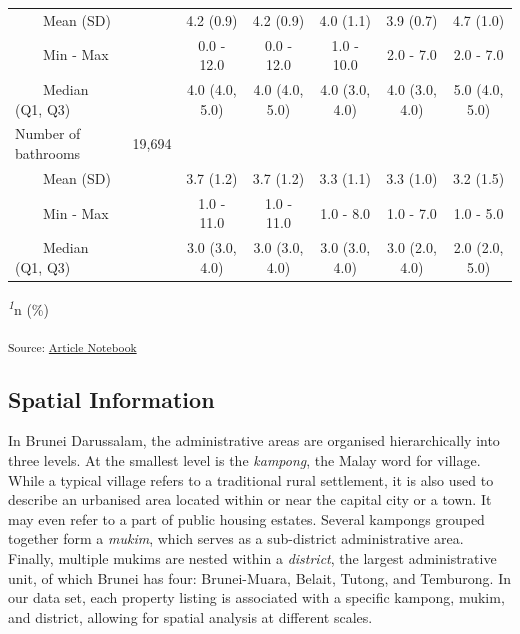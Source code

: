 \documentclass[
  number]{elsarticle}
\begin{document}
\begin{landscape}
\begin{table}
{\begin{tabular*}{\linewidth}{@{\extracolsep{\fill}}lcccccc}
    Mean (SD) &  & 4.2 (0.9) & 4.2 (0.9) & 4.0 (1.1) & 3.9 (0.7) & 4.7 (1.0) \\ 
    Min - Max &  & 0.0 - 12.0 & 0.0 - 12.0 & 1.0 - 10.0 & 2.0 - 7.0 & 2.0 - 7.0 \\ 
    Median (Q1, Q3) &  & 4.0 (4.0, 5.0) & 4.0 (4.0, 5.0) & 4.0 (3.0, 4.0) & 4.0 (3.0, 4.0) & 5.0 (4.0, 5.0) \\ 
Number of bathrooms & 19,694 &  &  &  &  &  \\ 
    Mean (SD) &  & 3.7 (1.2) & 3.7 (1.2) & 3.3 (1.1) & 3.3 (1.0) & 3.2 (1.5) \\ 
    Min - Max &  & 1.0 - 11.0 & 1.0 - 11.0 & 1.0 - 8.0 & 1.0 - 7.0 & 1.0 - 5.0 \\ 
    Median (Q1, Q3) &  & 3.0 (3.0, 4.0) & 3.0 (3.0, 4.0) & 3.0 (3.0, 4.0) & 3.0 (2.0, 4.0) & 2.0 (2.0, 5.0) \\ 
\bottomrule
\end{tabular*}
\begin{minipage}{\linewidth}
\textsuperscript{\textit{1}}n (\%)\\
\end{minipage}

\textsubscript{Source:
\href{https://Bruneiverse.github.io/house-data/manuscript.qmd.html}{Article
Notebook}}

}

\end{table}%

\end{landscape}

\subsection{Spatial Information}\label{spatial-information}

In Brunei Darussalam, the administrative areas are organised
hierarchically into three levels. At the smallest level is the
\emph{kampong}, the Malay word for village. While a typical village
refers to a traditional rural settlement, it is also used to describe an
urbanised area located within or near the capital city or a town. It may
even refer to a part of public housing estates. Several kampongs grouped
together form a \emph{mukim}, which serves as a sub-district
administrative area. Finally, multiple mukims are nested within a
\emph{district}, the largest administrative unit, of which Brunei has
four: Brunei-Muara, Belait, Tutong, and Temburong. In our data set, each
property listing is associated with a specific kampong, mukim, and
district, allowing for spatial analysis at different scales.
\end{document}
